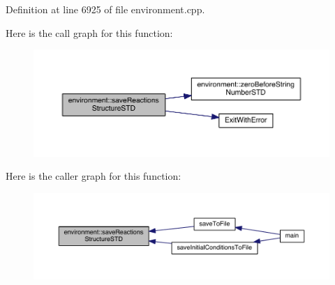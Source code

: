 Definition at line 6925 of file environment.\-cpp.



Here is the call graph for this function\-:\nopagebreak
\begin{figure}[H]
\begin{center}
\leavevmode
\includegraphics[width=350pt]{a00014_ad381c4ce24045d504539bb7c74800739_cgraph}
\end{center}
\end{figure}




Here is the caller graph for this function\-:\nopagebreak
\begin{figure}[H]
\begin{center}
\leavevmode
\includegraphics[width=350pt]{a00014_ad381c4ce24045d504539bb7c74800739_icgraph}
\end{center}
\end{figure}


